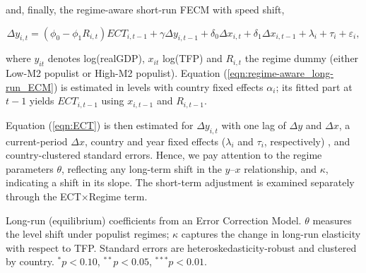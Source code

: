 \documentclass{OUP-EJ}
\begin{document}
and, finally, the regime-aware short-run FECM with speed shift,

\begin{equation}
    \Delta y_{i,t} = \left(\phi_0 - \phi_1 R_{i,t} \right)ECT_{i,t-1} + \gamma \Delta y_{i,t-1} + \delta_0 \Delta x_{i,t} +  \delta_1 \Delta x_{i,t-1} + \lambda_i + \tau_i + \varepsilon_i,
    \label{eqn:FECM}
\end{equation}

where $y_{it}$ denotes log(realGDP), $x_{it}$ log(TFP) and $R_{i,t}$ the regime dummy (either Low-M2 populist or High-M2 populist). Equation (\ref{eqn:regime-aware_long-run_ECM}) is estimated in levels with country fixed effects $\alpha_i$; its fitted part at $t-1$ yields $ECT_{i,t-1}$ using $x_{i,t-1}$ and $R_{i,t-1}$. 

Equation (\ref{eqn:ECT}) is then estimated for $\Delta y_{i,t}$ with one lag of $\Delta y$ and $\Delta x$, a current-period $\Delta x$, country and year fixed effects ($\lambda_i$ and $\tau_i$, respectively) , and country-clustered standard errors. Hence, we pay attention to the regime parameters $\theta$, reflecting any long-term shift in the $y–x$ relationship, and $\kappa$, indicating a shift in its slope. The short-term adjustment is examined separately through the ECT×Regime term.

\begin{table}[htbp]
\centering
\caption{ECM coefficients: Populist level and TFP interaction by M2-growth regime}
\label{tab:ecm_lr_results}
\begin{tablenotes} Long-run (equilibrium) coefficients from an Error Correction Model. 
$\theta$ measures the level shift under populist regimes; 
$\kappa$ captures the change in long-run elasticity with respect to TFP. 
Standard errors are heteroskedasticity-robust and clustered by country.
$^{*} p<0.10$, $^{**} p<0.05$, $^{***} p<0.01$.
\end{tablenotes}

\end{table}
\end{document}
